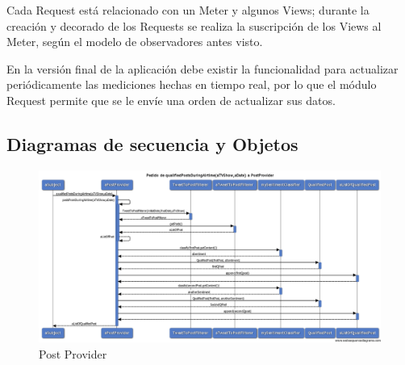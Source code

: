 Cada Request está relacionado con un  Meter y algunos Views; durante la creación y decorado de los Requests se realiza la suscripción de los Views al Meter, según el modelo de observadores antes visto.
\bigskip

En la versión final de la aplicación debe existir la funcionalidad para actualizar periódicamente las mediciones hechas en tiempo real, por lo que el módulo Request permite que se le envíe una orden de actualizar sus datos.




% 



\subsection{Diagramas de secuencia y Objetos}

\begin{figure}[H]
\centering
\includegraphics[width=\textwidth]{graph/diagramas_secuencia/PostProvider.png}
\caption{Post Provider}
\end{figure}

